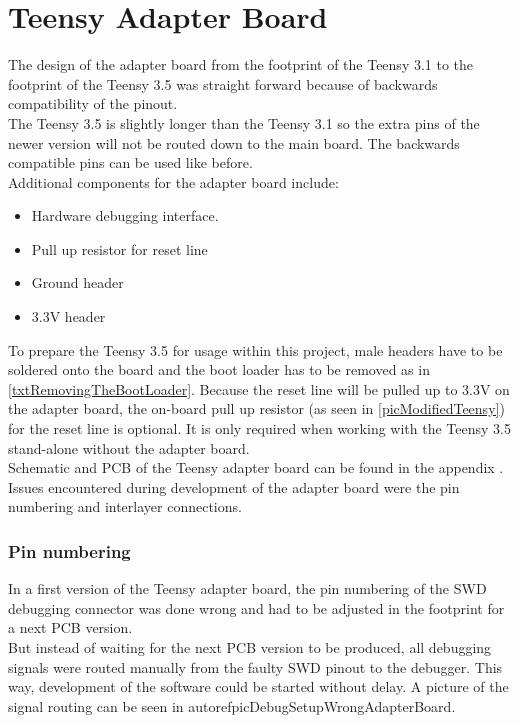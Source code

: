 \section{Teensy Adapter Board}
The design of the adapter board from the footprint of the Teensy 3.1 to the footprint of the Teensy 3.5 was straight forward because of backwards compatibility of the pinout.\\
The Teensy 3.5 is slightly longer than the Teensy 3.1 so the extra pins of the newer version will not be routed down to the main board. The backwards compatible pins can be used like before.\\
Additional components for the adapter board include:
\begin{itemize}
    \item Hardware debugging interface.
    \item Pull up resistor for reset line
    \item Ground header
    \item 3.3V header
\end{itemize}
To prepare the Teensy 3.5 for usage within this project, male headers have to be soldered onto the board and the boot loader has to be removed as in \ref{txtRemovingTheBootLoader}. Because the reset line will be pulled up to 3.3V on the adapter board, the on-board pull up resistor (as seen in \autoref{picModifiedTeensy}) for the reset line is optional. It is only required when working with the Teensy 3.5 stand-alone without the adapter board.\\
Schematic and PCB of the Teensy adapter board can be found in the appendix .\\
Issues encountered during development of the adapter board were the pin numbering and interlayer connections.
\subsubsection{Pin numbering}
In a first version of the Teensy adapter board, the pin numbering of the SWD debugging connector was done wrong and had to be adjusted in the footprint for a next PCB version.\\
But instead of waiting for the next PCB version to be produced, all debugging signals were routed manually from the faulty SWD pinout to the debugger. This way, development of the software could be started without delay. A picture of the signal routing can be seen in autoref{picDebugSetupWrongAdapterBoard}.
